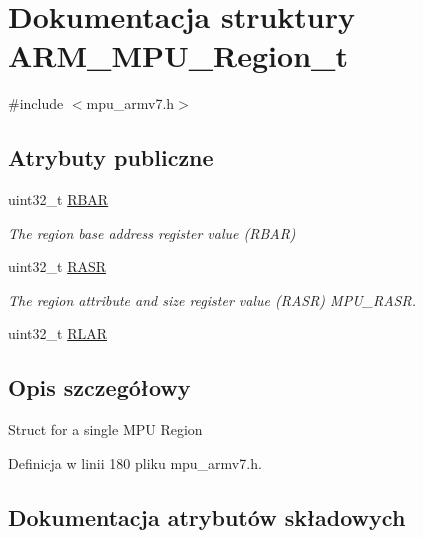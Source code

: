 \hypertarget{struct_a_r_m___m_p_u___region__t}{}\section{Dokumentacja struktury A\+R\+M\+\_\+\+M\+P\+U\+\_\+\+Region\+\_\+t}
\label{struct_a_r_m___m_p_u___region__t}


{\ttfamily \#include $<$mpu\+\_\+armv7.\+h$>$}

\subsection*{Atrybuty publiczne}
\begin{DoxyCompactItemize}
\item 
uint32\+\_\+t \hyperlink{struct_a_r_m___m_p_u___region__t_afe7a7721aa08988d915670efa432cdd2}{R\+B\+AR}
\begin{DoxyCompactList}\small\item\em The region base address register value (R\+B\+AR) \end{DoxyCompactList}\item 
uint32\+\_\+t \hyperlink{struct_a_r_m___m_p_u___region__t_a38c1d3bc6a9ffc9423d633add01928f1}{R\+A\+SR}
\begin{DoxyCompactList}\small\item\em The region attribute and size register value (R\+A\+SR) M\+P\+U\+\_\+\+R\+A\+SR. \end{DoxyCompactList}\item 
uint32\+\_\+t \hyperlink{struct_a_r_m___m_p_u___region__t_ab5d3a650dbffd0b272bf7df5b140e8a8}{R\+L\+AR}
\end{DoxyCompactItemize}


\subsection{Opis szczegółowy}
Struct for a single M\+PU Region 

Definicja w linii 180 pliku mpu\+\_\+armv7.\+h.



\subsection{Dokumentacja atrybutów składowych}
\mbox{\label{struct_a_r_m___m_p_u___region__t_a38c1d3bc6a9ffc9423d633add01928f1}} 
